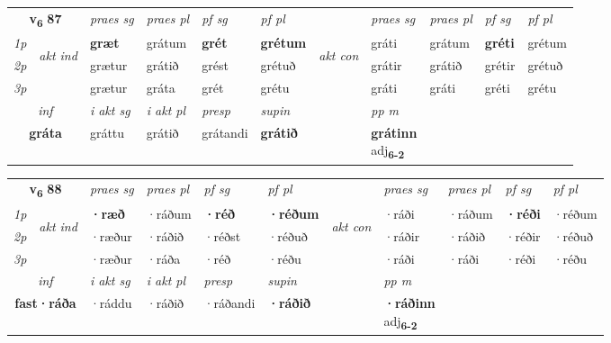 \noindent
\begin{tabular}{lllllllllll} \toprule
\multicolumn{2}{c}{\textbf{v{\textsubscript{6}}} \Large{\textbf{87}}}  &  \textit{praes sg}  & \textit{praes pl}  &\textit{ pf sg} & \textit{pf pl} &  &  \textit{praes sg}  & \textit{praes pl}  & \textit{pf sg} & \textit{pf pl } \\*
	\cmidrule{3-6} \cmidrule{8-11}
 {\textit{1p}} & \multirow{3}{*}{\begin{turn}{90}\textit{akt ind}\end{turn}} & \textbf{græt} & grátum & \textbf{grét} & \textbf{grétum} & \multirow{3}{*}{\begin{turn}{90}\textit{akt con}\end{turn}} &gráti & grátum & \textbf{gréti} & grétum\\*
 {\textit{2p}} &  &  grætur  & grátið & grést & grétuð & & grátir & grátið & grétir & grétuð \\*
{\textit{3p}} &  & grætur & gráta & grét & grétu & & gráti & gráti& gréti & grétu \\*
\cmidrule{3-6} \cmidrule{8-11}

   \multicolumn{2}{c}{\textit{inf}}  & \textit{i akt sg} & \textit{i akt pl}   & \textit{presp} & \textit{supin}  && \textit{pp m} \\*
  \multicolumn{2}{c}{\textbf{gráta}} & gráttu  & grátið   & grátandi &  \textbf{grátið}  && \specialcell{\textbf{grátinn} \\ adj\textbf{\textsubscript{6-2}}} \\*
\end{tabular}

\noindent
\noindent
\begin{tabular}{lllllllllll} \toprule
\multicolumn{2}{c}{\textbf{v{\textsubscript{6}}} \Large{\textbf{88}}}  &  \textit{praes sg}  & \textit{praes pl}  &\textit{ pf sg} & \textit{pf pl} &  &  \textit{praes sg}  & \textit{praes pl}  & \textit{pf sg} & \textit{pf pl } \\*
	\cmidrule{3-6} \cmidrule{8-11}
 {\textit{1p}} & \multirow{3}{*}{\begin{turn}{90}\textit{akt ind}\end{turn}} & \textbf{·ræð} & ·ráðum & \textbf{·réð} & \textbf{·réðum} & \multirow{3}{*}{\begin{turn}{90}\textit{akt con}\end{turn}} &·ráði & ·ráðum & \textbf{·réði} & ·réðum\\*
 {\textit{2p}} &  &  ·ræður  & ·ráðið & ·réðst & ·réðuð & & ·ráðir & ·ráðið & ·réðir & ·réðuð \\*
{\textit{3p}} &  & ·ræður & ·ráða & ·réð & ·réðu & & ·ráði & ·ráði& ·réði & ·réðu \\*
\cmidrule{3-6} \cmidrule{8-11}

   \multicolumn{2}{c}{\textit{inf}}  & \textit{i akt sg} & \textit{i akt pl}   & \textit{presp} & \textit{supin}  && \textit{pp m} \\*
  \multicolumn{2}{c}{\textbf{fast\allowbreak ·ráða}} & ·ráddu  & ·ráðið   & ·ráðandi &  \textbf{·ráðið}  && \specialcell{\textbf{·ráðinn} \\ adj\textbf{\textsubscript{6-2}}} \\*
\end{tabular}

